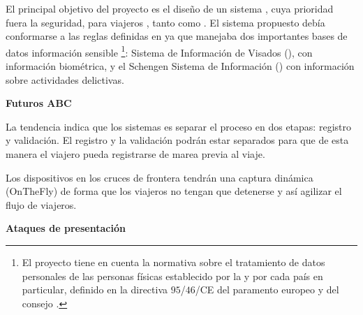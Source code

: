El principal objetivo del proyecto es el diseño de un sistema , cuya prioridad fuera la seguridad, para viajeros , tanto  como . El sistema propuesto debía conformarse a las reglas definidas en  ya que manejaba dos importantes bases de datos información sensible \footnote{El proyecto  tiene en cuenta la normativa sobre el tratamiento de datos personales de las personas físicas establecido por la  y por cada país en particular, definido en la directiva $95$/$46$/CE del paramento europeo y del consejo \cite{europea1995directiva}.}: Sistema de Información de Visados (), con información biométrica, y el  \Gls{Schengen} Sistema de Información () con información sobre actividades delictivas.

\medskip
\textbf{Futuros \Gls{ABC}} 
\medskip

La tendencia indica que los sistemas  es separar el proceso en dos etapas: registro y validación. El registro y la validación podrán estar separados para que de esta manera el viajero pueda registrarse de marea previa al viaje.

Los dispositivos  en los cruces de frontera tendrán una captura dinámica (\Gls{OnTheFly}) de forma que los viajeros no tengan que detenerse y así agilizar el flujo de viajeros.

\medskip
\textbf{Ataques de presentación} 
\medskip




